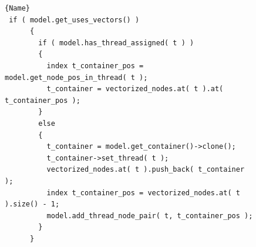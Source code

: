 \begin{figure}[ht!]
    \centering
\begin{lstlisting}[caption=Assigning containers to threads,frame=tlrb, label=lst:thread_container]{Name}
 if ( model.get_uses_vectors() )
      {
        if ( model.has_thread_assigned( t ) )
        {
          index t_container_pos = model.get_node_pos_in_thread( t );
          t_container = vectorized_nodes.at( t ).at( t_container_pos );
        }
        else
        {
          t_container = model.get_container()->clone();
          t_container->set_thread( t );
          vectorized_nodes.at( t ).push_back( t_container );
          index t_container_pos = vectorized_nodes.at( t ).size() - 1;
          model.add_thread_node_pair( t, t_container_pos );
        }
      }
      
\end{lstlisting}
\end{figure}

